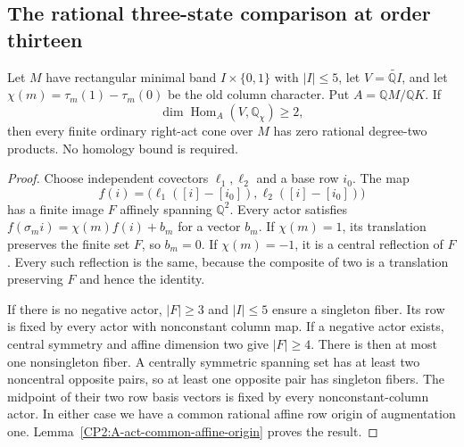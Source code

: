 \subsection{The rational three-state comparison at order thirteen}

\begin{lemma}
\label{CP2:A-two-covector-affine-row-origin}
Let $M$ have rectangular minimal band $I\times\{0,1\}$ with
$|I|\leq5$, let $V=\widetilde{\mathbb QI}$, and let
$\chi(m)=\tau_m(1)-\tau_m(0)$ be the old column character.
Put $A=\mathbb QM/\mathbb QK$. If
\[
 \dim\operatorname{Hom}_A(V,\mathbb Q_\chi)\geq2,
\]
then every finite ordinary right-act cone over $M$ has zero
rational degree-two products. No homology bound is required.
\end{lemma}
\begin{proof}
Choose independent covectors $\ell_1,\ell_2$ and a base row
$i_0$. The map
\[
 f(i)=\bigl(\ell_1([i]-[i_0]),\ell_2([i]-[i_0])\bigr)
\]
has a finite image $F$ affinely spanning $\mathbb Q^2$.
Every actor satisfies
$f(\sigma_m i)=\chi(m)f(i)+b_m$ for a vector $b_m$.
If $\chi(m)=1$, its translation preserves the finite set
$F$, so $b_m=0$. If $\chi(m)=-1$, it is a central
reflection of $F$. Every such reflection is the same,
because the composite of two is a translation preserving
$F$ and hence the identity.

If there is no negative actor, $|F|\geq3$ and $|I|\leq5$
ensure a singleton fiber. Its row is fixed by every actor
with nonconstant column map. If a negative actor exists,
central symmetry and affine dimension two give $|F|\geq4$.
There is then at most one nonsingleton fiber. A centrally
symmetric spanning set has at least two noncentral opposite
pairs, so at least one opposite pair has singleton fibers.
The midpoint of their two row basis vectors is fixed by
every nonconstant-column actor. In either case we have a
common rational affine row origin of augmentation one.
Lemma~\ref{CP2:A-act-common-affine-origin} proves the result.
\end{proof}

